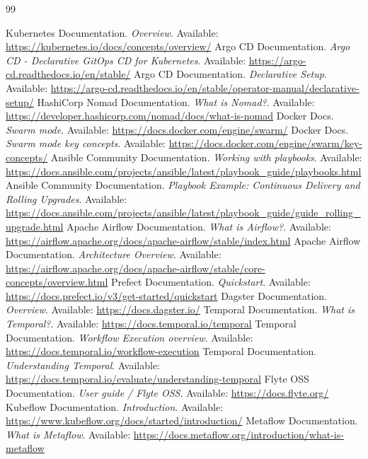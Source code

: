 \documentclass[11pt]{article}
\begin{document}
\begin{thebibliography}{99}
\raggedright
{} Kubernetes Documentation. \emph{Overview}. Available: \url{https://kubernetes.io/docs/concepts/overview/}
 Argo CD Documentation. \emph{Argo CD - Declarative GitOps CD for Kubernetes}. Available: \url{https://argo-cd.readthedocs.io/en/stable/}
 Argo CD Documentation. \emph{Declarative Setup}. Available: \url{https://argo-cd.readthedocs.io/en/stable/operator-manual/declarative-setup/}
 HashiCorp Nomad Documentation. \emph{What is Nomad?}. Available: \url{https://developer.hashicorp.com/nomad/docs/what-is-nomad}
 Docker Docs. \emph{Swarm mode}. Available: \url{https://docs.docker.com/engine/swarm/}
 Docker Docs. \emph{Swarm mode key concepts}. Available: \url{https://docs.docker.com/engine/swarm/key-concepts/}
 Ansible Community Documentation. \emph{Working with playbooks}. Available: \url{https://docs.ansible.com/projects/ansible/latest/playbook_guide/playbooks.html}
 Ansible Community Documentation. \emph{Playbook Example: Continuous Delivery and Rolling Upgrades}. Available: \url{https://docs.ansible.com/projects/ansible/latest/playbook_guide/guide_rolling_upgrade.html}
 Apache Airflow Documentation. \emph{What is Airflow?}. Available: \url{https://airflow.apache.org/docs/apache-airflow/stable/index.html}
 Apache Airflow Documentation. \emph{Architecture Overview}. Available: \url{https://airflow.apache.org/docs/apache-airflow/stable/core-concepts/overview.html}
 Prefect Documentation. \emph{Quickstart}. Available: \url{https://docs.prefect.io/v3/get-started/quickstart}
 Dagster Documentation. \emph{Overview}. Available: \url{https://docs.dagster.io/}
 Temporal Documentation. \emph{What is Temporal?}. Available: \url{https://docs.temporal.io/temporal}
 Temporal Documentation. \emph{Workflow Execution overview}. Available: \url{https://docs.temporal.io/workflow-execution}
 Temporal Documentation. \emph{Understanding Temporal}. Available: \url{https://docs.temporal.io/evaluate/understanding-temporal}
 Flyte OSS Documentation. \emph{User guide / Flyte OSS}. Available: \url{https://docs.flyte.org/}
 Kubeflow Documentation. \emph{Introduction}. Available: \url{https://www.kubeflow.org/docs/started/introduction/}
 Metaflow Documentation. \emph{What is Metaflow}. Available: \url{https://docs.metaflow.org/introduction/what-is-metaflow}
\end{thebibliography}
\end{document}
